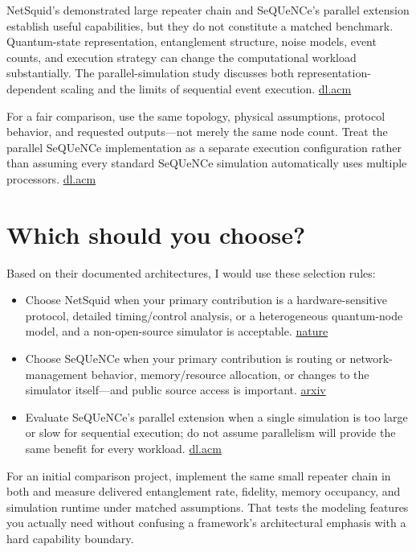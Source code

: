 \documentclass[11pt]{article}
\newcommand{\nature}{\href{https://www.nature.com/articles/s42005-021-00647-8}{nature}}
\newcommand{\arxivseq}{\href{https://arxiv.org/html/2009.12000}{arxiv}}
\newcommand{\dlacm}{\href{https://dl.acm.org/doi/10.1145/3634701}{dl.acm}}
\begin{document}
NetSquid's demonstrated large repeater chain and SeQUeNCe's parallel extension establish useful capabilities, but they do not constitute a matched benchmark. Quantum-state representation, entanglement structure, noise models, event counts, and execution strategy can change the computational workload substantially. The parallel-simulation study discusses both representation-dependent scaling and the limits of sequential event execution. \dlacm

For a fair comparison, use the same topology, physical assumptions, protocol behavior, and requested outputs---not merely the same node count. Treat the parallel SeQUeNCe implementation as a separate execution configuration rather than assuming every standard SeQUeNCe simulation automatically uses multiple processors. \dlacm

\section{Which should you choose?}

Based on their documented architectures, I would use these selection rules:

\begin{itemize}[leftmargin=*]
    \item Choose NetSquid when your primary contribution is a hardware-sensitive protocol, detailed timing/control analysis, or a heterogeneous quantum-node model, and a non-open-source simulator is acceptable. \nature
    \item Choose SeQUeNCe when your primary contribution is routing or network-management behavior, memory/resource allocation, or changes to the simulator itself---and public source access is important. \arxivseq
    \item Evaluate SeQUeNCe's parallel extension when a single simulation is too large or slow for sequential execution; do not assume parallelism will provide the same benefit for every workload. \dlacm
\end{itemize}

For an initial comparison project, implement the same small repeater chain in both and measure delivered entanglement rate, fidelity, memory occupancy, and simulation runtime under matched assumptions. That tests the modeling features you actually need without confusing a framework's architectural emphasis with a hard capability boundary.
\end{document}
